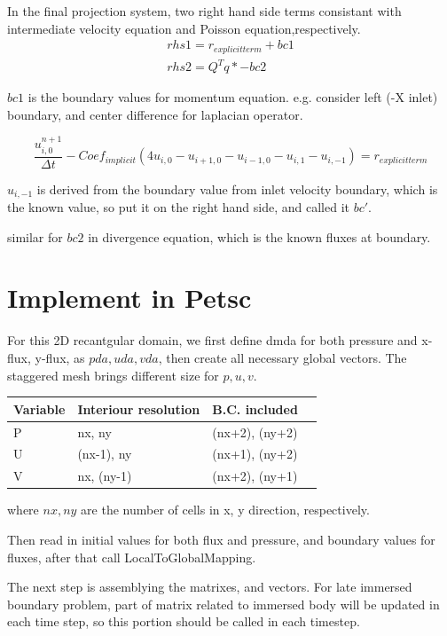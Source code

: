 \documentclass[11pt]{article}
\begin{document}
In the final projection system, two right hand side terms consistant with intermediate velocity equation and Poisson equation,respectively. 
\begin{align}
	rhs1 = r_{explicit term} + bc1
\\	rhs2 = Q^T q* - bc2
 \end{align}

$bc1$ is the boundary values for momentum equation. e.g. consider left (-X inlet) boundary, and center difference for laplacian operator.

$$ \frac{u_{i,0}^{n+1}}{\Delta t} - Coef_{implicit} (4u_{i,0} - u_{i+1,0} - u_{i-1,0} - u_{i,1} - u_{i,-1}) = r_{explicit term} $$

$u_{i,-1}$ is derived from the boundary value from inlet velocity boundary, which is the known value, so put it on the right hand side, and called it $bc'$.

similar for $bc2$ in divergence equation, which is the known fluxes at boundary.


\section{Implement in Petsc}

For this 2D recantgular domain, we first define dmda for both pressure and x-flux, y-flux, as $pda, uda, vda$, then create all necessary global vectors. The staggered mesh brings different size for $p, u, v$.

\begin{center}
	\begin{tabular}{|l |l |l |l|}
	\hline
	Variable & Interiour resolution & B.C. included \\ \hline
	P	&  nx, ny & (nx+2), (ny+2) \\ \hline
	U	&  (nx-1), ny & (nx+1), (ny+2) \\ \hline
 	V	&  nx, (ny-1) & (nx+2), (ny+1) \\ 
	\hline
	\end{tabular}
\end{center}
  
where $nx,ny$ are the number of cells in x, y direction, respectively.

Then read in initial values for both flux and pressure, and boundary values for fluxes, after that call LocalToGlobalMapping.

The next step is assemblying the matrixes, and vectors. For late immersed boundary problem, part of matrix related to immersed body will be updated in each time step, so this portion should be called in each timestep.
\end{document}
